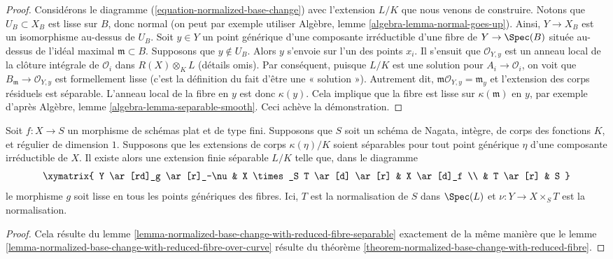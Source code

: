 \begin{proof}
\medskip\noindent
Considérons le diagramme (\ref{equation-normalized-base-change})
avec l'extension $L/K$ que nous venons de construire. Notons que $U_B \subset X_B$
est lisse sur $B$, donc normal (on peut par exemple utiliser
Algèbre, lemme \ref{algebra-lemma-normal-goes-up}).
Ainsi, $Y \to X_B$ est un isomorphisme au-dessus de $U_B$.
Soit $y \in Y$ un point générique d'une composante irréductible
d'une fibre de $Y \to \Spec(B)$ située au-dessus de l'idéal maximal
$\mathfrak m \subset B$. Supposons que $y \not \in U_B$.
Alors $y$ s'envoie sur l'un des points $x_i$. Il s'ensuit que
$\mathcal{O}_{Y, y}$ est un anneau local de la clôture intégrale
de $\mathcal{O}_i$ dans $R(X) \otimes_K L$ (détails omis).
Par conséquent, puisque $L/K$ est une solution pour
$A_i \to \mathcal{O}_i$, on voit que
$B_\mathfrak m \to \mathcal{O}_{Y, y}$ est formellement lisse
(c'est la définition du fait d'être une « solution »).
Autrement dit, $\mathfrak m\mathcal{O}_{Y, y} = \mathfrak m_y$
et l'extension des corps résiduels est séparable. L'anneau local
de la fibre en $y$ est donc $\kappa(y)$.
Cela implique que la fibre est lisse sur $\kappa(\mathfrak m)$
en $y$, par exemple d'après Algèbre, lemme \ref{algebra-lemma-separable-smooth}.
Ceci achève la démonstration.
\end{proof}

\begin{lemma}
\label{lemma-normalized-base-change-with-reduced-fibre-over-curve-separable}
Soit $f : X \to S$ un morphisme de schémas plat et de type fini.
Supposons que $S$ soit un schéma de Nagata, intègre, de corps des fonctions $K$, et
régulier de dimension $1$. Supposons que les extensions de corps $\kappa(\eta)/K$
soient séparables pour tout point générique $\eta$ d'une composante
irréductible de $X$. Il existe alors une extension finie séparable $L/K$
telle que, dans le diagramme
$$
\xymatrix{
Y \ar[rd]_g \ar[r]_-\nu & X \times_S T \ar[d] \ar[r] & X \ar[d]_f \\
& T \ar[r] & S
}
$$
le morphisme $g$ soit lisse en tous les points génériques des fibres. Ici,
$T$ est la normalisation de $S$ dans $\Spec(L)$ et $\nu : Y \to X \times_S T$
est la normalisation.
\end{lemma}

\begin{proof}
Cela résulte du
lemme \ref{lemma-normalized-base-change-with-reduced-fibre-separable}
exactement de la même manière que le
lemme \ref{lemma-normalized-base-change-with-reduced-fibre-over-curve}
résulte du
théorème \ref{theorem-normalized-base-change-with-reduced-fibre}.
\end{proof}









